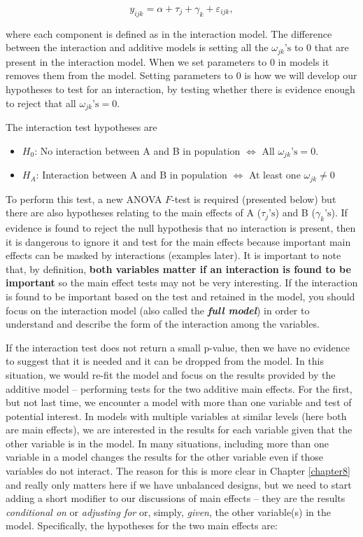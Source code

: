 \documentclass[]{book}
\theoremstyle{definition}
\theoremstyle{definition}
\theoremstyle{remark}
\begin{document}
\[y_{ijk} = \alpha + \tau_j + \gamma_k + \varepsilon_{ijk},\]

where each component is defined as in the interaction model. The
difference between the interaction and additive models is setting all
the \(\omega_{jk}\text{'s}\) to 0 that are present in the interaction
model. When we set parameters to 0 in models it removes them from the
model. Setting parameters to 0 is how we will develop our hypotheses to
test for an interaction, by testing whether there is evidence enough to
reject that all \(\omega_{jk}\text{'s}=0\).

The interaction test hypotheses are

\begin{itemize}
\item
  \(H_0\): No interaction between A and B in population
  \(\Leftrightarrow\) All \(\omega_{jk}\text{'s}=0\).
\item
  \(H_A\): Interaction between A and B in population \(\Leftrightarrow\)
  At least one \(\omega_{jk}\ne 0\)
\end{itemize}

To perform this test, a new ANOVA \(F\)-test is required (presented
below) but there are also hypotheses relating to the main effects of A
(\(\tau_j\text{'s}\)) and B (\(\gamma_k\text{'s}\)). If evidence is
found to reject the null hypothesis that no interaction is present, then
it is dangerous to ignore it and test for the main effects because
important main effects can be masked by interactions (examples later).
It is important to note that, by definition, \textbf{both variables
matter if an interaction is found to be important} so the main effect
tests may not be very interesting. If the interaction is found to be
important based on the test and retained in the model, you should focus
on the interaction model (also called the \textbf{\emph{full model}}) in
order to understand and describe the form of the interaction among the
variables.

If the interaction test does not return a small p-value, then we have no
evidence to suggest that it is needed and it can be dropped from the
model. In this situation, we would re-fit the model and focus on the
results provided by the additive model -- performing tests for the two
additive main effects. For the first, but not last time, we encounter a
model with more than one variable and test of potential interest. In
models with multiple variables at similar levels (here both are main
effects), we are interested in the results for each variable given that
the other variable is in the model. In many situations, including more
than one variable in a model changes the results for the other variable
even if those variables do not interact. The reason for this is more
clear in Chapter \ref{chapter8} and really only matters here if we have
unbalanced designs, but we need to start adding a short modifier to our
discussions of main effects -- they are the results \emph{conditional
on} or \emph{adjusting for} or, simply, \emph{given}, the other
variable(s) in the model. Specifically, the hypotheses for the two main
effects are:
\end{document}
